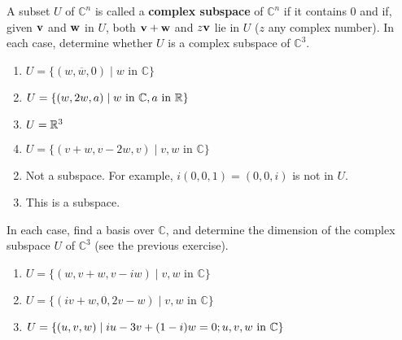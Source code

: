 \begin{multicols}{2}
\begin{ex}
A subset $U$ of $\mathbb{C}^n$ is called a \textbf{complex subspace} of $\mathbb{C}^n$ if it contains $0$ and if, given $\textbf{v}$ and $\textbf{w}$ in $U$, both $\textbf{v} + \textbf{w}$ and $z\textbf{v}$ lie in $U$ ($z$ any complex number). In each case, determine whether $U$ is a complex subspace of $\mathbb{C}^3$.


\begin{enumerate}[label={\alph*.}]
\item $U = \{(w, \overline{w}, 0) \mid w \mbox{ in } \mathbb{C}\}$

\item $U = \{(w, 2w, a) \mid w \mbox{ in } \mathbb{C}, a \mbox{ in } \mathbb{R}\}$

\item $U = \mathbb{R}^3$

\item $U = \{(v + w, v - 2w, v) \mid v, w \mbox{ in } \mathbb{C}\}$

\end{enumerate}
\begin{sol}
\begin{enumerate}[label={\alph*.}]
\setcounter{enumi}{1}
\item  Not a subspace. For example, $i(0, 0, 1) = (0, 0, i)$ is not in $U$.

\setcounter{enumi}{3}
\item  This is a subspace.

\end{enumerate}
\end{sol}
\end{ex}

\begin{ex}
In each case, find a basis over $\mathbb{C}$, and determine the dimension of the complex subspace $U$ of $\mathbb{C}^3$ (see the previous exercise).


\begin{enumerate}[label={\alph*.}]
\item $U = \{(w, v + w, v - iw) \mid v, w \mbox{ in } \mathbb{C}\}$

\item $U = \{(iv + w, 0, 2v - w) \mid v, w \mbox{ in } \mathbb{C}\}$

\item $U = \{(u, v, w) \mid  iu - 3v + (1 - i)w = 0;\  \\ u, v, w \mbox{ in } \mathbb{C}\}$


\end{enumerate}
\end{ex}
\end{multicols}
